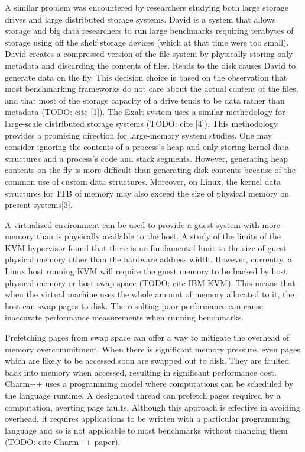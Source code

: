 \documentclass[twocolumn,11pt]{article}
\begin{document}
A similar problem was encountered by researchers studying both large storage
drives and large distributed storage systems. David is a system that allows
storage and big data researchers to run large benchmarks requiring terabytes of
storage using off the shelf storage devices (which at that time were too
small). David creates a compressed version of the file system by physically
storing only metadata and discarding the contents of files. Reads to the disk
causes David to generate data on the fly. This decision choice is based on the
observation that most benchmarking frameworks do not care about the actual
content of the files, and that most of the storage capacity of a drive tends to
be data rather than metadata (TODO: cite [1]). The Exalt system uses a similar
methodology for large-scale distributed storage systems (TODO: cite [4]). This
methodology provides a promising direction for large-memory system studies. One
may consider ignoring the contents of a process’s heap and only storing kernel
data structures and a process’s code and stack segments. However, generating
heap contents on the fly is more difficult than generating disk contents
because of the common use of custom data structures. Moreover, on Linux, the
kernel data structures for 1TB of memory may also exceed the size of physical
memory on present systems[3].

A virtualized environment can be used to provide a guest system with more
memory than is physically available to the host. A study of the limits of the
KVM hypervisor found that there is no fundamental limit to the size of guest
physical memory other than the hardware address width. However, currently, a
Linux host running KVM will require the guest memory to be backed by host
physical memory or host swap space (TODO: cite IBM KVM).  This means that when
the virtual machine uses the whole amount of memory allocated to it, the host
can swap pages to disk. The resulting poor performance can cause inaccurate
performance measurements when running benchmarks.

Prefetching pages from swap space can offer a way to mitigate the overhead of
memory overcommitment. When there is significant memory pressure, even pages
which are likely to be accessed soon are swapped out to disk. They are faulted
back into memory when accessed, resulting in significant performance cost.
Charm++ uses a programming model where computations can be scheduled by the
language runtime. A designated thread can prefetch pages required by a
computation, averting page faults. Although this approach is effective in
avoiding overhead, it requires applications to be written with a particular
programming language and so is not applicable to most benchmarks without
changing them (TODO: cite Charm++ paper).
\end{document}
